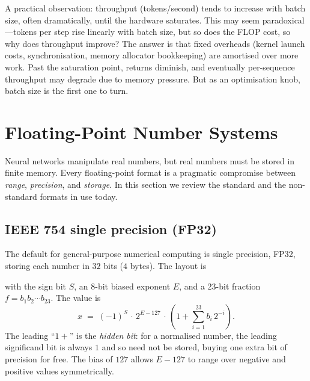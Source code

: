 \documentclass[11pt,a4paper]{article}
\theoremstyle{definition}
\theoremstyle{remark}
\theoremstyle{plain}
\newcommand{\FPN}[1]{\textrm{FP#1}}
\begin{document}
A practical observation: throughput (tokens/second) tends to increase
with batch size, often dramatically, until the hardware saturates. This
may seem paradoxical---tokens per step rise linearly with batch size, but
so does the FLOP cost, so why does throughput improve? The answer is that
fixed overheads (kernel launch costs, synchronisation, memory allocator
bookkeeping) are amortised over more work. Past the saturation point,
returns diminish, and eventually per-sequence throughput may degrade due
to memory pressure. But as an optimisation knob, batch size is the first
one to turn.

\section{Floating-Point Number Systems}
\label{sec:fp}

Neural networks manipulate real numbers, but real numbers must be stored
in finite memory. Every floating-point format is a pragmatic compromise
between \emph{range}, \emph{precision}, and \emph{storage}. In this
section we review the standard and the non-standard formats in use today.

\subsection{IEEE 754 single precision (FP32)}

The default for general-purpose numerical computing is single precision,
\FPN{32}, storing each number in $32$ bits ($4$ bytes). The layout is
\begin{center}
\end{center}
with the sign bit $S$, an 8-bit biased exponent $E$, and a 23-bit
fraction $f = b_1 b_2 \cdots b_{23}$. The value is
\begin{equation}
x \;=\; (-1)^{S} \,\cdot\, 2^{E - 127} \,\cdot\,
\left(1 + \sum_{i=1}^{23} b_i\, 2^{-i}\right).
\label{eq:fp32}
\end{equation}
The leading ``$1+$'' is the \emph{hidden bit}: for a normalised number,
the leading significand bit is always $1$ and so need not be stored,
buying one extra bit of precision for free. The bias of $127$ allows
$E - 127$ to range over negative and positive values symmetrically.
\end{document}
